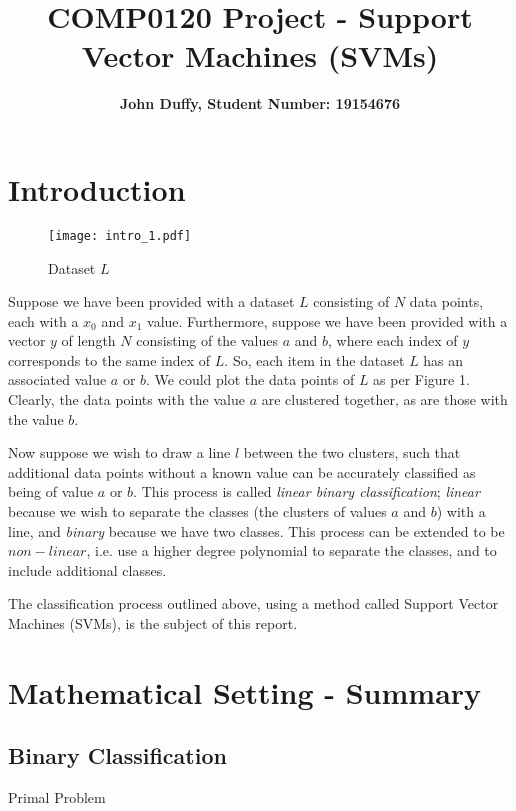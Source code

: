 \documentclass[10pt, a4paper]{amsart}
\title{COMP0120 Project - Support Vector Machines (SVM\MakeLowercase{s})}
\author{\textbf{John Duffy, Student Number: 19154676}}
\begin{document}
\maketitle

\section{Introduction}

\begin{figure}
	\centering	
	\texttt{[image: intro\_1.pdf]}
	\caption{Dataset $L$}
\end{figure}

Suppose we have been provided with a dataset $L$ consisting of $N$ data points, each with a $x_0$ and $x_1$ value. Furthermore, suppose we have been provided with a vector $y$ of length $N$ consisting of the values $a$ and $b$, where each index of $y$ corresponds to the same index of $L$. So, each item in the dataset $L$ has an associated value $a$ or $b$. We could plot the data points of $L$ as per Figure 1. Clearly, the data points with the value $a$ are clustered together, as are those with the value $b$.

Now suppose we wish to draw a line $l$ between the two clusters, such that additional data points without a known value can be accurately classified as being of value $a$ or $b$. This process is called \emph{linear binary classification}; \emph{linear} because we wish to separate the classes (the clusters of values $a$ and $b$) with a line, and \emph{binary} because we have two classes. This process can be extended to be $non-linear$, i.e. use a higher degree polynomial to separate the classes, and to include additional classes.  

The classification process outlined above, using a method called Support Vector Machines (SVMs), is the subject of this report.
\section{Mathematical Setting - Summary}

\subsection{Binary Classification}\hfill

Primal Problem


%
\end{document}
